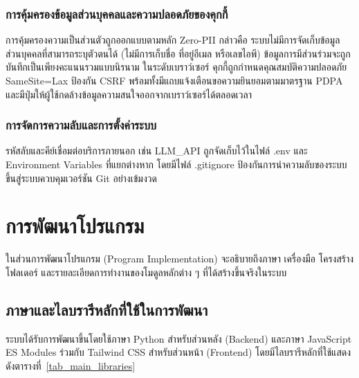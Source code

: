 \subsubsection{การคุ้มครองข้อมูลส่วนบุคคลและความปลอดภัยของคุกกี้}

การคุ้มครองความเป็นส่วนตัวถูกออกแบบตามหลัก Zero-PII กล่าวคือ ระบบไม่มีการจัดเก็บข้อมูลส่วนบุคคลที่สามารถระบุตัวตนได้ (ไม่มีการเก็บชื่อ ที่อยู่อีเมล หรือเลขไอพี) ข้อมูลการมีส่วนร่วมจะถูกบันทึกเป็นเพียงคะแนนรวมแบบนิรนาม ในระดับเบราว์เซอร์ คุกกี้ถูกกำหนดคุณสมบัติความปลอดภัย SameSite=Lax ป้องกัน CSRF พร้อมทั้งมีแถบแจ้งเตือนขอความยินยอมตามมาตรฐาน PDPA และมีปุ่มให้ผู้ใช้กดล้างข้อมูลความสนใจออกจากเบราว์เซอร์ได้ตลอดเวลา

\subsubsection{การจัดการความลับและการตั้งค่าระบบ}

รหัสลับและคีย์เชื่อมต่อบริการภายนอก เช่น LLM\_API ถูกจัดเก็บไว้ในไฟล์ .env และ Environment Variables ที่แยกต่างหาก โดยมีไฟล์ .gitignore ป้องกันการนำความลับของระบบขึ้นสู่ระบบควบคุมเวอร์ชัน Git อย่างเข้มงวด

\section{การพัฒนาโปรแกรม}

ในส่วนการพัฒนาโปรแกรม (Program Implementation) จะอธิบายถึงภาษา เครื่องมือ โครงสร้างโฟลเดอร์ และรายละเอียดการทำงานของโมดูลหลักต่าง ๆ ที่ได้สร้างขึ้นจริงในระบบ

\subsection{ภาษาและไลบรารีหลักที่ใช้ในการพัฒนา}

ระบบได้รับการพัฒนาขึ้นโดยใช้ภาษา Python สำหรับส่วนหลัง (Backend) และภาษา JavaScript ES Modules ร่วมกับ Tailwind CSS สำหรับส่วนหน้า (Frontend) โดยมีไลบรารีหลักที่ใช้แสดงดังตารางที่~\ref{tab_main_libraries}


